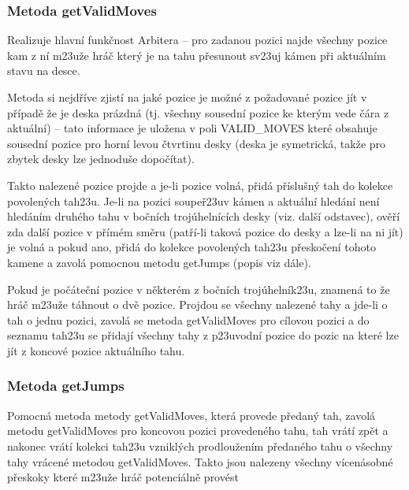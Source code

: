 \documentclass{article}
\begin{document}
\subsubsection{Metoda getValidMoves}
Realizuje hlavn\'i funk\v{c}nost Arbitera – pro zadanou pozici najde v\v{s}echny pozice kam z n\'i m\accent23u\v{z}e hr\'a\v{c} kter\'y je na tahu p\v{r}esunout sv\accent23uj k\'amen p\v{r}i aktu\'aln\'im stavu na desce.\medskip

Metoda si nejd\v{r}\'ive zjist\'i na jak\'e pozice je mo\v{z}n\'e z po\v{z}adovan\'e pozice j\'it v p\v{r}\'ipad\v{e} \v{z}e je deska pr\'azdn\'a (tj. v\v{s}echny sousedn\'i pozice ke kter\'ym vede \v{c}\'ara z aktu\'aln\'i) – tato informace je ulo\v{z}ena v poli VALID\_MOVES kter\'e obsahuje sousedn\'i pozice pro horn\'i levou \v{c}tvrtinu desky (deska je symetrick\'a, tak\v{z}e pro zbytek desky lze jednodu\v{s}e dopo\v{c}\'itat).\medskip

Takto nalezen\'e pozice projde a je-li pozice voln\'a, p\v{r}id\'a p\v{r}\'islu\v{s}n\'y tah do kolekce povolen\'ych tah\accent23u. Je-li na pozici soupe\v{r}\accent23uv k\'amen a aktu\'aln\'i hled\'an\'i nen\'i hled\'an\'im druh\'eho tahu v bo\v{c}n\'ich troj\'uheln\'ic\'ich desky (viz. dal\v{s}\'i odstavec), ov\v{e}\v{r}\'i zda dal\v{s}\'i pozice v p\v{r}\'im\'em sm\v{e}ru (pat\v{r}\'i-li takov\'a pozice do desky a lze-li na ni j\'it) je voln\'a a pokud ano, p\v{r}id\'a do kolekce povolen\'ych tah\accent23u p\v{r}esko\v{c}en\'i tohoto kamene a zavol\'a pomocnou metodu getJumps (popis viz d\'ale).\medskip

Pokud je po\v{c}\'ate\v{c}n\'i pozice v n\v{e}kter\'em z bo\v{c}n\'ich troj\'uheln\'ik\accent23u, znamen\'a to \v{z}e hr\'a\v{c} m\accent23u\v{z}e t\'ahnout o dv\v{e} pozice. Projdou se v\v{s}echny nalezen\'e tahy a jde-li o tah o jednu pozici, zavol\'a se metoda getValidMoves pro c\'ilovou pozici a do seznamu tah\accent23u se p\v{r}idaj\'i v\v{s}echny tahy z p\accent23uvodn\'i pozice do pozic na kter\'e lze j\'it z koncov\'e pozice aktu\'aln\'iho tahu.

\subsubsection{Metoda getJumps}
Pomocn\'a metoda metody getValidMoves, kter\'a provede p\v{r}edan\'y tah, zavol\'a metodu getValidMoves pro koncovou pozici proveden\'eho tahu, tah vr\'at\'i zp\v{e}t a nakonec vr\'at\'i kolekci tah\accent23u vznikl\'ych prodlou\v{z}en\'im p\v{r}edan\'eho tahu o v\v{s}echny tahy vr\'acen\'e metodou getValidMoves. Takto jsou nalezeny v\v{s}echny v\'icen\'asobn\'e p\v{r}eskoky kter\'e m\accent23u\v{z}e hr\'a\v{c} potenci\'aln\v{e} prov\'est
\end{document}

